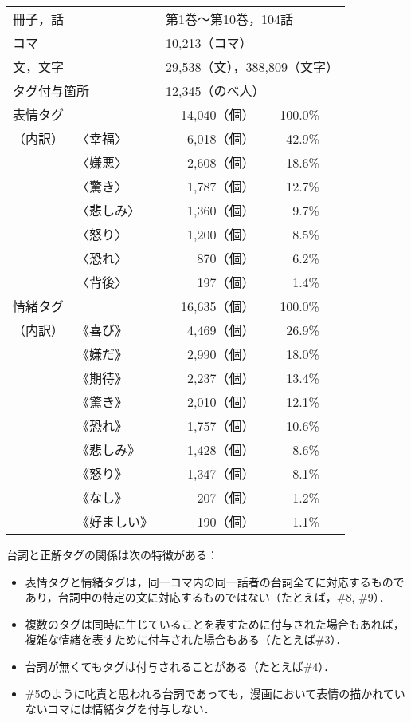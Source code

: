 \documentclass[japanese]{jnlp_1.3c}
\begin{document}
\begin{table}[b]
\begin{center}
\begin{tabular}{llrr}
\hline
\multicolumn{2}{l}{冊子，話} & \multicolumn{2}{l}{第1巻〜第10巻，104話} \\
\multicolumn{2}{l}{コマ} & \multicolumn{2}{l}{10,213（コマ）} \\
\multicolumn{2}{l}{文，文字} & \multicolumn{2}{l}{29,538（文），388,809（文字）} \\
\multicolumn{2}{l}{タグ付与箇所} & \multicolumn{2}{l}{12,345（のべ人）} \\
\hline
\multicolumn{2}{l}{表情タグ} & 14,040（個） & 100.0\%~~~ \\
（内訳）&〈幸福〉  & 6,018（個） & 42.9\%~~~ \\
        &〈嫌悪〉  & 2,608（個） & 18.6\%~~~ \\
        &〈驚き〉  & 1,787（個） & 12.7\%~~~ \\
        &〈悲しみ〉& 1,360（個） &  9.7\%~~~ \\
        &〈怒り〉  & 1,200（個） &  8.5\%~~~ \\
        &〈恐れ〉  &   870（個） &  6.2\%~~~ \\
        &〈背後〉  &   197（個） &  1.4\%~~~ \\
\hline
\multicolumn{2}{l}{情緒タグ} & 16,635（個） & 100.0\%~~~ \\
（内訳）& 《喜び》   & 4,469（個） & 26.9\%~~~ \\
        & 《嫌だ》   & 2,990（個） & 18.0\%~~~ \\
        & 《期待》   & 2,237（個） & 13.4\%~~~ \\
        & 《驚き》   & 2,010（個） & 12.1\%~~~ \\
        & 《恐れ》   & 1,757（個） & 10.6\%~~~ \\
        & 《悲しみ》 & 1,428（個） &  8.6\%~~~ \\
        & 《怒り》   & 1,347（個） &  8.1\%~~~ \\
        & 《なし》   &   207（個） &  1.2\%~~~ \\
        & 《好ましい》&  190（個） &  1.1\%~~~ \\
\hline
\end{tabular}
\end{center}
\end{table}

台詞と正解タグの関係は次の特徴がある：
\begin{itemize}
\item 表情タグと情緒タグは，同一コマ内の同一話者の台詞全てに対応するものであり，台詞中の特定の文に対応するものではない（たとえば，\#8, \#9）．
\item 複数のタグは同時に生じていることを表すために付与された場合もあれば，複雑な情緒を表すために付与された場合もある（たとえば\#3）．
\item 台詞が無くてもタグは付与されることがある（たとえば\#4）．
\item \#5のように叱責と思われる台詞であっても，漫画において表情の描かれていないコマには情緒タグを付与しない．
\end{itemize}
\end{document}
